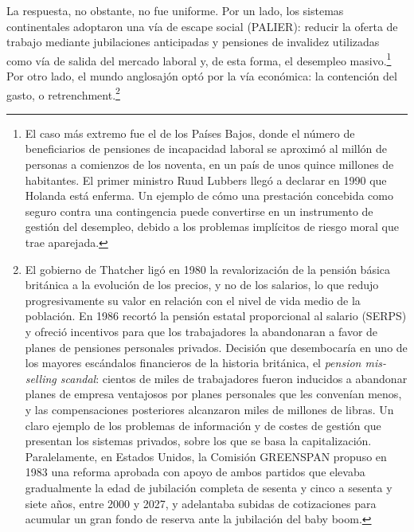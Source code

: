 \documentclass[10pt,a4paper]{article}
\begin{document}
La respuesta, no obstante, no fue uniforme. Por un lado, los sistemas continentales adoptaron una vía de escape social (PALIER): reducir la oferta de trabajo mediante jubilaciones anticipadas y pensiones de invalidez utilizadas como vía de salida del mercado laboral y, de esta forma, el desempleo masivo.\footnote{El caso más extremo fue el de los Países Bajos, donde el número de beneficiarios de pensiones de incapacidad laboral se aproximó al millón de personas a comienzos de los noventa, en un país de unos quince millones de habitantes. El primer ministro Ruud Lubbers llegó a declarar en 1990 que Holanda está enferma. Un ejemplo de cómo una prestación concebida como seguro contra una contingencia puede convertirse en un instrumento de gestión del desempleo, debido a los problemas implícitos de riesgo moral que trae aparejada.
} Por otro lado, el mundo anglosajón optó por la vía económica: la contención del gasto, o retrenchment.\footnote{El gobierno de Thatcher ligó en 1980 la revalorización de la pensión básica británica a la evolución de los precios, y no de los salarios, lo que redujo progresivamente su valor en relación con el nivel de vida medio de la población. En 1986 recortó la pensión estatal proporcional al salario (SERPS) y ofreció incentivos para que los trabajadores la abandonaran a favor de planes de pensiones personales privados. Decisión que desembocaría en uno de los mayores escándalos financieros de la historia británica, el \textit{pension mis-selling scandal}: cientos de miles de trabajadores fueron inducidos a abandonar planes de empresa ventajosos por planes personales que les convenían menos, y las compensaciones posteriores alcanzaron miles de millones de libras. Un claro ejemplo de los problemas de información y de costes de gestión que presentan los sistemas privados, sobre los que se basa la capitalización. Paralelamente, en Estados Unidos, la Comisión GREENSPAN propuso en 1983 una reforma aprobada con apoyo de ambos partidos que elevaba gradualmente la edad de jubilación completa de sesenta y cinco a sesenta y siete años, entre 2000 y 2027, y adelantaba subidas de cotizaciones para acumular un gran fondo de reserva ante la jubilación del baby boom.
}
\end{document}
